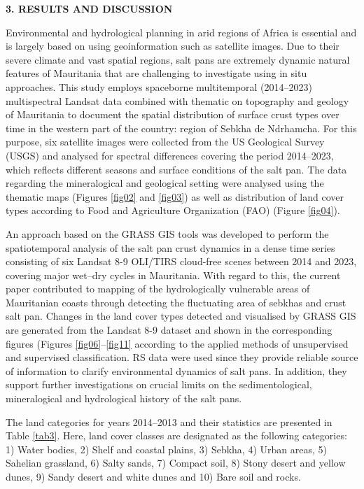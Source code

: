 \documentclass[12pt,a4paper,oneside]{article}
\def \newsection{\vspace{12pt}\textbf}
\def \newpar{\vspace{6pt}}
\begin{document}
\newsection {3. RESULTS AND DISCUSSION}

\newpar Environmental and hydrological planning in arid regions of Africa is essential and is largely based on using geoinformation such as satellite images. Due to their severe climate and vast spatial regions, salt pans are extremely dynamic natural features of Mauritania that are challenging to investigate using in situ approaches. This study employs spaceborne multitemporal (2014–2023) multispectral Landsat data combined with thematic on topography and geology of Mauritania to document the spatial distribution of surface crust types over time in the western part of the country: region of Sebkha de Ndrhamcha. For this purpose, six satellite images were collected from the US Geological Survey (USGS) and analysed for spectral differences covering the period 2014–2023, which reflects different seasons and surface conditions of the salt pan. The data regarding the mineralogical and geological setting were analysed using the thematic maps (Figures \ref{fig02} and \ref{fig03}) as well as distribution of land cover types according to Food and Agriculture Organization (FAO) (Figure \ref{fig04}).

\newpar An approach based on the GRASS GIS tools was developed to perform the spatiotemporal analysis of the salt pan crust dynamics in a dense time series consisting of six Landsat 8-9 OLI/TIRS cloud-free scenes between 2014 and 2023, covering major wet–dry cycles in Mauritania. With regard to this, the current paper contributed to mapping of the hydrologically vulnerable areas of Mauritanian coasts through detecting the fluctuating area of sebkhas and crust salt pan. Changes in the land cover types detected and visualised by GRASS GIS are generated from the Landsat 8-9 dataset and shown in the corresponding figures (Figures \ref{fig06}--\ref{fig11} according to the applied methods of unsupervised and supervised classification. RS data were used since they provide reliable source of information to clarify environmental dynamics of salt pans. In addition, they support further investigations on crucial limits on the sedimentological, mineralogical and hydrological history of the salt pans.

\newpar The land categories for years 2014–2013 and their statistics are presented in Table \ref{tab3}. Here, land cover classes are designated as the following categories: 1) Water bodies, 2) Shelf and coastal plains, 3) Sebkha, 4) Urban areas, 5) Sahelian grassland, 6) Salty sands, 7) Compact soil, 8) Stony desert and yellow dunes, 9) Sandy desert and white dunes and 10) Bare soil and rocks.
\end{document}
